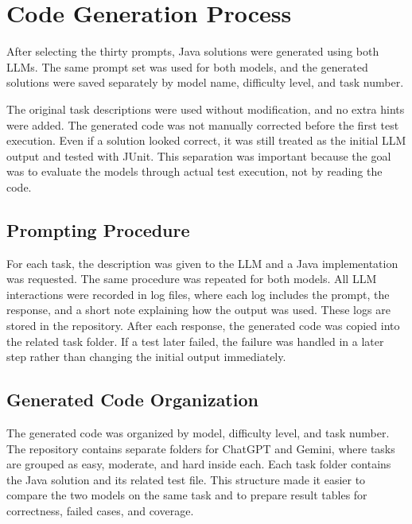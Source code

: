 \documentclass[journal]{IEEEtran}
\begin{document}
\section{Code Generation Process}
After selecting the thirty prompts, Java solutions were generated using both LLMs. The same prompt set was used for both models, and the generated solutions were saved separately by model name, difficulty level, and task number.

The original task descriptions were used without modification, and no extra hints were added. The generated code was not manually corrected before the first test execution. Even if a solution looked correct, it was still treated as the initial LLM output and tested with JUnit. This separation was important because the goal was to evaluate the models through actual test execution, not by reading the code.

\subsection{Prompting Procedure}
For each task, the description was given to the LLM and a Java implementation was requested. The same procedure was repeated for both models. All LLM interactions were recorded in log files, where each log includes the prompt, the response, and a short note explaining how the output was used. These logs are stored in the repository. After each response, the generated code was copied into the related task folder. If a test later failed, the failure was handled in a later step rather than changing the initial output immediately.

\subsection{Generated Code Organization}
The generated code was organized by model, difficulty level, and task number. The repository contains separate folders for ChatGPT and Gemini, where tasks are grouped as easy, moderate, and hard inside each. Each task folder contains the Java solution and its related test file. This structure made it easier to compare the two models on the same task and to prepare result tables for correctness, failed cases, and coverage.
\end{document}
